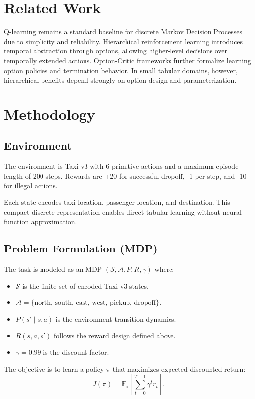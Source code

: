 \documentclass[conference]{IEEEtran}
\begin{document}
\section{Related Work}
Q-learning remains a standard baseline for discrete Markov Decision Processes due to simplicity and reliability. Hierarchical reinforcement learning introduces temporal abstraction through options, allowing higher-level decisions over temporally extended actions. Option-Critic frameworks further formalize learning option policies and termination behavior. In small tabular domains, however, hierarchical benefits depend strongly on option design and parameterization.

\section{Methodology}
\subsection{Environment}
The environment is Taxi-v3 with 6 primitive actions and a maximum episode length of 200 steps. Rewards are +20 for successful dropoff, -1 per step, and -10 for illegal actions.

Each state encodes taxi location, passenger location, and destination. This compact discrete representation enables direct tabular learning without neural function approximation.

\subsection{Problem Formulation (MDP)}
The task is modeled as an MDP $(\mathcal{S}, \mathcal{A}, P, R, \gamma)$ where:
\begin{itemize}
\item $\mathcal{S}$ is the finite set of encoded Taxi-v3 states.
\item $\mathcal{A}=\{\text{north, south, east, west, pickup, dropoff}\}$.
\item $P(s'\mid s,a)$ is the environment transition dynamics.
\item $R(s,a,s')$ follows the reward design defined above.
\item $\gamma=0.99$ is the discount factor.
\end{itemize}

The objective is to learn a policy $\pi$ that maximizes expected discounted return:
\begin{equation}
J(\pi)=\mathbb{E}_{\pi}\left[\sum_{t=0}^{T-1} \gamma^t r_t\right].
\end{equation}
\end{document}
